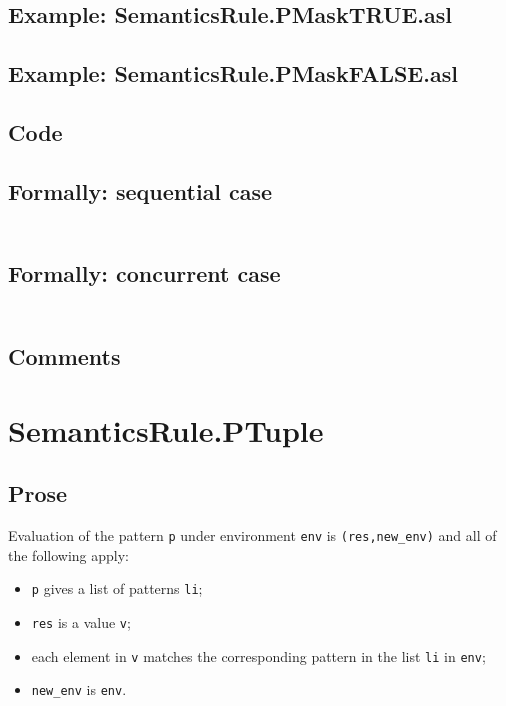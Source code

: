 \documentclass{book}
\begin{document}
    \subsection{Example: SemanticsRule.PMaskTRUE.asl}

    \subsection{Example: SemanticsRule.PMaskFALSE.asl}

  \subsection{Code}

  \subsection{Formally: sequential case}
  \begin{align}
  \end{align} 

  \subsection{Formally: concurrent case}
  \begin{align}
  \end{align} 

    \subsection{Comments}

\section{SemanticsRule.PTuple \label{sec:SemanticsRule.PTuple}}

    \subsection{Prose}
   Evaluation of the pattern \texttt{p} under environment \texttt{env} is
  \texttt{(res,new\_env)} and all of the following apply: 
    \begin{itemize}
    \item \texttt{p} gives a list of patterns \texttt{li};
    \item \texttt{res} is a value \texttt{v};
    \item each element in \texttt{v} matches the corresponding pattern in the list \texttt{li} in \texttt{env};
    \item \texttt{new\_env} is \texttt{env}.
    \end{itemize}
\end{document}
